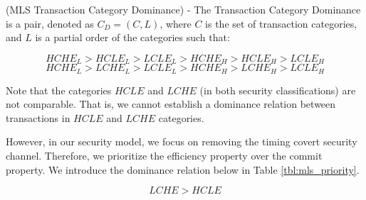 \begin{definition}
\label{mls:cat_dominance}
(MLS Transaction Category Dominance) - The Transaction Category Dominance is a pair, denoted as $C_{D} = (C,L)$, where $C$ is the set of transaction categories, and $L$ is a partial order of the categories such that:
 
\[\textrm{$HCHE_L > HCLE_L > LCLE_L > HCHE_H > HCLE_H > LCLE_H$}\]
\[\textrm{$HCHE_L > LCHE_L > LCLE_L > HCHE_H > LCHE_H > LCLE_H$} \]

\begin{figure}[h]
\captionsetup{justification=centering}
\centering %


\label{fig:mls_category_lattice} %

\end{figure}

{\normalfont Note that the categories $HCLE$ and $LCHE$ (in both security classifications) are not comparable. That is, we cannot establish a dominance relation between transactions in $HCLE$ and $LCHE$ categories.

However, in our security model, we focus on removing the timing covert security channel. Therefore, we prioritize the efficiency property over the commit property. We introduce the dominance relation below in Table \ref{tbl:mls_priority}.}

\[\textrm{$LCHE > HCLE$} \]
 

\end{definition}
